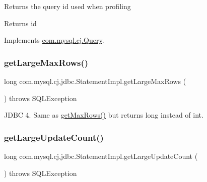Returns the query id used when profiling

\begin{DoxyReturn}{Returns}
id 
\end{DoxyReturn}


Implements \mbox{\hyperlink{interfacecom_1_1mysql_1_1cj_1_1_query_a29f450bbae1063765d434e3b89bdd26e}{com.\+mysql.\+cj.\+Query}}.

\mbox{\label{classcom_1_1mysql_1_1cj_1_1jdbc_1_1_statement_impl_a413626efa58d8aac8c72b36bb0ff4c33}} 
\subsubsection{\texorpdfstring{get\+Large\+Max\+Rows()}{getLargeMaxRows()}}
{\footnotesize\ttfamily long com.\+mysql.\+cj.\+jdbc.\+Statement\+Impl.\+get\+Large\+Max\+Rows (\begin{DoxyParamCaption}{ }\end{DoxyParamCaption}) throws S\+Q\+L\+Exception}

J\+D\+BC 4. Same as \mbox{\hyperlink{classcom_1_1mysql_1_1cj_1_1jdbc_1_1_statement_impl_ae2447bc18fbb4aba8ef64f48f0c90c36}{get\+Max\+Rows()}} but returns long instead of int. \mbox{\label{classcom_1_1mysql_1_1cj_1_1jdbc_1_1_statement_impl_aeb27ff7e4f987d731094d20bf30fefad}} 
\subsubsection{\texorpdfstring{get\+Large\+Update\+Count()}{getLargeUpdateCount()}}
{\footnotesize\ttfamily long com.\+mysql.\+cj.\+jdbc.\+Statement\+Impl.\+get\+Large\+Update\+Count (\begin{DoxyParamCaption}{ }\end{DoxyParamCaption}) throws S\+Q\+L\+Exception}

